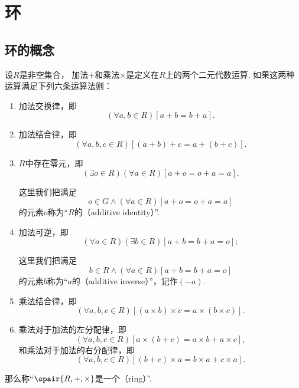 \section{环}
\subsection{环的概念}
\begin{definition}\label{definition:抽象代数.环的定义}
设\(R\)是非空集合，
加法\(+\)和乘法\(\times\)是定义在\(R\)上的两个二元代数运算.
如果这两种运算满足下列六条运算法则：
\begin{enumerate}
	\item 加法交换律，即\begin{equation*}
		(\forall a,b \in R)[a+b = b+a].
	\end{equation*}

	\item 加法结合律，即\begin{equation*}
		(\forall a,b,c \in R)[(a+b)+c = a+(b+c)].
	\end{equation*}

	\item \(R\)中存在零元，即\begin{equation*}
		(\exists o \in R)(\forall a \in R)[a+o = o+a = a].
	\end{equation*}

	这里我们把满足\begin{equation*}
		o \in G
		\land
		(\forall a \in R)[a+o = o+a = a]
	\end{equation*}的元素\(o\)称为“\(R\)的（additive identity）”.

	\item 加法可逆，即\begin{equation*}
		(\forall a \in R)(\exists b \in R)[a+b = b+a = o];
	\end{equation*}

	这里我们把满足\begin{equation*}
		b \in R
		\land
		(\forall a \in R)[a+b = b+a = o]
	\end{equation*}的元素\(b\)称为“\(a\)的（additive inverse）”，记作\((-a)\).

	\item 乘法结合律，即\begin{equation*}
		(\forall a,b,c \in R)
		[ (a \times b) \times c = a \times (b \times c) ].
	\end{equation*}

	\item 乘法对于加法的左分配律，即\begin{equation*}
		(\forall a,b,c \in R)[ a \times (b+c) = a \times b + a \times c ],
	\end{equation*}
	和乘法对于加法的右分配律，即\begin{equation*}
		(\forall a,b,c \in R)[ (b+c) \times a = b \times a + c \times a ].
	\end{equation*}
\end{enumerate}
那么称“\(\opair{R,+,\times}\)是一个（ring）”.
\end{definition}

